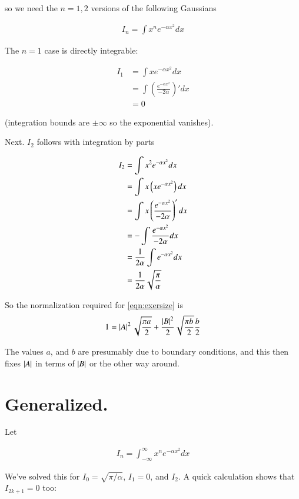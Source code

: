 \documentclass{article}
\begin{document}
so we need the $n=1,2$ versions of the following Gaussians

\begin{align*}
I_n = \int x^n e^{-\alpha x^2} dx
\end{align*}

The $n=1$ case is directly integrable:

\begin{align*}
I_1 
&= \int x e^{-\alpha x^2} dx \\
&= \int \left(\frac{e^{-\alpha x^2}}{-2\alpha}\right)' dx \\
&= 0
\end{align*}

(integration bounds are $\pm \infty$ so the exponential vanishes).

Next.  $I_2$ follows with integration by parts

\begin{align*}
I_2 
&= \int x^2 e^{-\alpha x^2} dx \\
&= \int x \left(x e^{-\alpha x^2}\right) dx \\
&= \int x \left(\frac{e^{-\alpha x^2}}{-2\alpha}\right)' dx \\
&= -\int \frac{e^{-\alpha x^2}}{-2\alpha} dx \\
&= \frac{1}{2\alpha}\int e^{-\alpha x^2} dx \\
&= \frac{1}{2\alpha} \sqrt{\frac{\pi}{\alpha}}
\end{align*}

So the normalization required for \ref{eqn:exersize} is
\begin{align*}
1 = \left\lvert{A}\right\rvert^2 \sqrt{\frac{\pi a}{2}} + \frac{\left\lvert{B}\right\rvert^2}{2} 
\sqrt{\frac{\pi b}{2}} \frac{b}{2}
\end{align*}

The values $a$, and $b$ are presumably due to boundary conditions, and this then fixes $\left\lvert{A}\right\rvert$ in terms of $\left\lvert{B}\right\rvert$ or the other way around.

\section{ Generalized. }

Let 

\begin{align}
I_n = \int_{-\infty}^\infty x^n e^{-\alpha x^2} dx
\end{align}

We've solved this for $I_0 = \sqrt{\pi/\alpha}$, $I_1 = 0$, and $I_2$.  A quick calculation shows that $I_{2k+1} = 0$ too:
\end{document}
